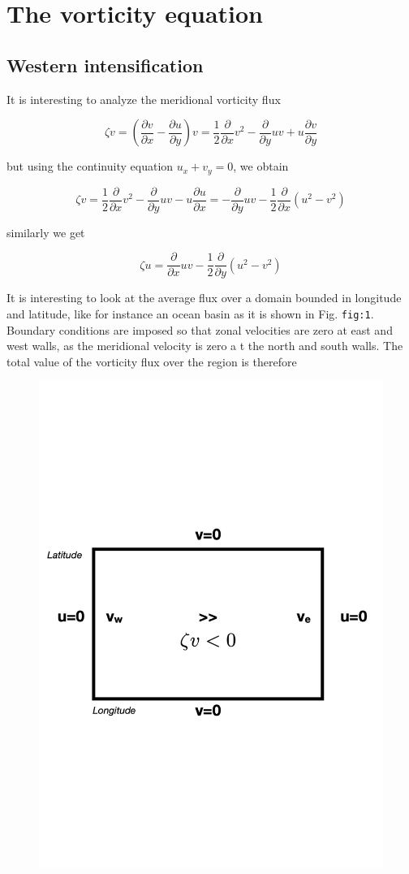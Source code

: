 \section{The vorticity equation}\label{the-vorticity-equation}

\subsection{Western intensification}\label{western-intensification}

It is interesting to analyze the meridional vorticity flux

\[\zeta v = \left( \frac{\partial v}{\partial x} -\frac{\partial u}{\partial y}\right) v = \frac{1}{2}\frac{\partial }{\partial x} v^2 -\frac{\partial }{\partial y} u v + u \frac{\partial v}{\partial y}\]

but using the continuity equation \(u_x+v_y=0\), we obtain

\[\zeta v = \frac{1}{2}\frac{\partial }{\partial x} v^2 -\frac{\partial }{\partial y} u v -u \frac{\partial u}{\partial x}= -\frac{\partial }{\partial y} u v -\frac{1}{2}\frac{\partial }{\partial x}( u^2-v^2)\]

similarly we get

\[\zeta u =  \frac{\partial }{\partial x} u v -\frac{1}{2}\frac{\partial }{\partial y}( u^2-v^2)\]

It is interesting to look at the average flux over a domain bounded in
longitude and latitude, like for instance an ocean basin as it is shown
in Fig. \texttt{fig:1}. Boundary conditions are imposed so that zonal
velocities are zero at east and west walls, as the meridional velocity
is zero a t the north and south walls. The total value of the vorticity
flux over the region is therefore

\begin{figure}
\centering
\includegraphics[width= .7 \textwidth]{figs/GD/Untitled.png}
\caption{}
\label{fig:}
\end{figure}

